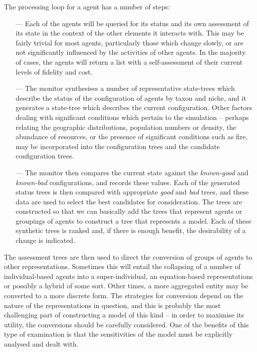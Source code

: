 The processing loop for a  agent has a number of
steps:
\begin{itemize}
\item[---] Each of the agents will be queried for its status
and its own assessment of its state in the context of the other
elements it interacts with.  This may be fairly trivial for most
agents, particularly those which change slowly, or are not
significantly influenced by the activities of other agents.
In the majority of cases, the agents will return a list with a
self-assessment of their current levels of fidelity and cost.
\item[---] The monitor synthesises a number of representative
state-trees which describe the status of the configuration of agents
by taxon and niche, and it generates a state-tree which describes the
current configuration. Other factors dealing with significant
conditions which pertain to the simulation -- perhaps relating the
geographic distributions, population numbers or density, the abundance
of resources, or the presence of significant conditions such as fire,
may be incorporated into the configuration trees and the candidate
configuration trees.
\item[---] The monitor then compares the current state against
the \emph{known-good} and \emph{known-bad} configurations, and records
these values.  Each of the generated status trees is then compared
with appropriate \emph{good} and \emph{bad} trees, and these data are
used to select the best candidates for consideration.  The trees are
constructed so that we can basically add the trees that represent
agents or groupings of agents to construct a tree that represents a
model. Each of these synthetic trees is ranked and, if there is enough
benefit, the desirability of a change is indicated.
\end{itemize}

The assessment trees are then used to direct the conversion of groups
of agents to other representations.  Sometimes this will entail the
collapsing of a number of individual-based agents into a
super-individual, an equation-based representations or possibly a
hybrid of some sort.  Other times, a more aggregated entity may be
converted to a more discrete form. The strategies for conversion
depend on the nature of the representations in question, and this is
probably the most challenging part of constructing a model of this
kind -- in order to maximise its utility, the conversions should be
carefully considered.  One of the benefits of this type of examination
is that the sensitivities of the model must be explicitly analysed and
dealt with.


